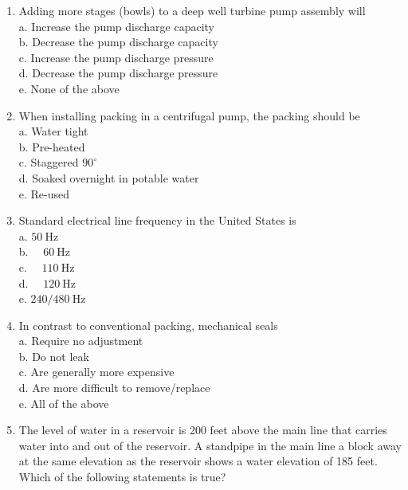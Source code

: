 \documentclass{article}
\begin{document}
\begin{enumerate}[1.]
\item Adding more stages (bowls) to a deep well turbine pump assembly will\\

a. Increase the pump discharge capacity\\

b. Decrease the pump discharge capacity\\

c. Increase the pump discharge pressure\\

d. Decrease the pump discharge pressure\\

e. None of the above

\item When installing packing in a centrifugal pump, the packing should be\\
a. Water tight\\
b. Pre-heated\\
c. Staggered $90^{\circ}$\\
d. Soaked overnight in potable water\\
e. Re-used\\

  \item Standard electrical line frequency in the United States is\\
a. $50 \mathrm{~Hz}$\\
b. $\quad 60 \mathrm{~Hz}$\\
c. $\quad 110 \mathrm{~Hz}$\\
d. $\quad 120 \mathrm{~Hz}$\\
e. $240 / 480 \mathrm{~Hz}$\\

\item In contrast to conventional packing, mechanical seals\\
a. Require no adjustment\\
b. Do not leak\\
c. Are generally more expensive\\
d. Are more difficult to remove/replace\\
e. All of the above\\

\item The level of water in a reservoir is 200 feet above the main line that carries water into and out of the reservoir. A standpipe in the main line a block away at the same elevation as the reservoir shows a water elevation of 185 feet. Which of the following statements is true?


\end{enumerate}
\end{document}
